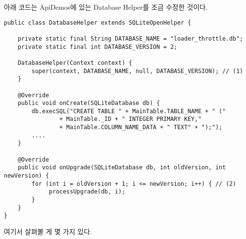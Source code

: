 아래 코드는 ApiDemos에 있는 Database Helper를 조금 수정한 것이다.
\begin{lstlisting}[frame=single] 
public class DatabaseHelper extends SQLiteOpenHelper {

	private static final String DATABASE_NAME = "loader_throttle.db";
	private static final int DATABASE_VERSION = 2;

	DatabaseHelper(Context context) {
		super(context, DATABASE_NAME, null, DATABASE_VERSION); // (1)
	}

	@Override
	public void onCreate(SQLiteDatabase db) {
		db.execSQL("CREATE TABLE " + MainTable.TABLE_NAME + " ("
				+ MainTable._ID + " INTEGER PRIMARY KEY,"
				+ MainTable.COLUMN_NAME_DATA + " TEXT" + ");");
		....
	}

	@Override
	public void onUpgrade(SQLiteDatabase db, int oldVersion, int newVersion) {
		for (int i = oldVersion + 1; i <= newVersion; i++) { // (2)
			 processUpgrade(db, i);
		}
	}
}
\end{lstlisting}
여기서 살펴볼 게 몇 가지 있다.

